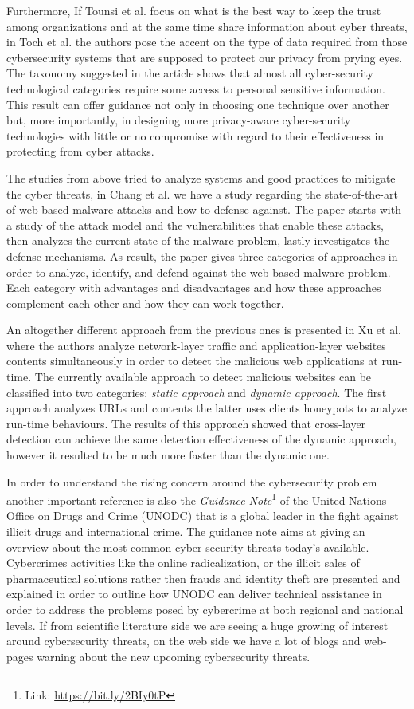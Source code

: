 Furthermore, If Tounsi et al. focus on what is the best way to keep the trust among organizations and at the same time share information about cyber threats, in Toch et al. \cite{Toch:2018:PIC:3186333.3172869} the authors pose the accent on the type of data required from those cybersecurity systems that are supposed to protect our privacy from prying eyes. The taxonomy suggested in the article shows that almost all cyber-security technological categories require some access to personal sensitive information. This result can offer guidance not only in choosing one technique over another but, more importantly, in designing more privacy-aware cyber-security technologies with little or no compromise with regard to their effectiveness in protecting from cyber attacks. 

The studies from above tried to analyze systems and good practices to mitigate the cyber threats, in Chang et al. \cite{ChangVWL13} we have a study regarding the state-of-the-art of web-based malware attacks and how to defense against. The paper starts with a study of the attack model and the vulnerabilities that enable these attacks, then analyzes the current state of the malware problem, lastly investigates the defense mechanisms. As result, the paper gives three categories of approaches in order to analyze, identify, and defend against the web-based malware problem. Each category with advantages and disadvantages and how these approaches complement each other and how they can work together. 

An altogether different approach from the previous ones is presented in Xu et al. \cite{Xu:2013:CDM:2435349.2435366} where the authors analyze network-layer traffic and application-layer websites contents simultaneously in order to detect the malicious web applications at run-time. The currently available approach to detect malicious websites can be classified into two categories: \textit{static approach} and \textit{dynamic approach}. The first approach analyzes URLs and contents the latter uses clients honeypots to analyze run-time behaviours. The results of this approach showed that cross-layer detection can achieve the same detection effectiveness of the dynamic approach, however it resulted to be much more faster than the dynamic one. 

In order to understand the rising concern around the cybersecurity problem another important reference is also the \emph{Guidance Note}\footnote{Link: \href{}{https://bit.ly/2BIy0tP}} of the United Nations Office on Drugs and Crime (UNODC) that is a global leader in the fight against illicit drugs and international crime. The guidance note aims at giving an overview about the most common cyber security threats today's available. Cybercrimes activities like the online radicalization, or the illicit sales of pharmaceutical solutions rather then frauds and identity theft are presented and explained in order to outline how UNODC can deliver technical assistance in order to address the problems posed by cybercrime at both regional and national levels.
If from scientific literature side we are seeing a huge growing of interest around cybersecurity threats, on the web side we have a lot of blogs and web-pages warning about the new upcoming cybersecurity threats. 

